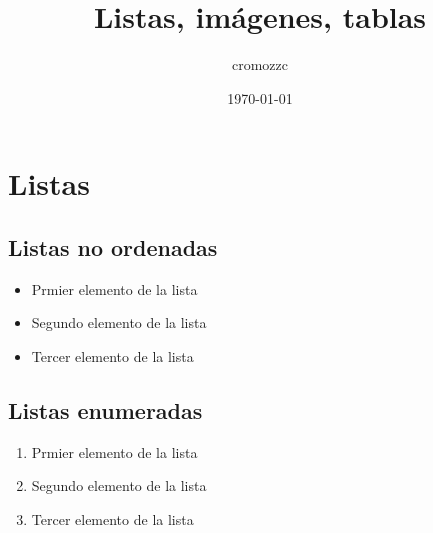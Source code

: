 \documentclass[titlepage,12pt]{article}
\title{Listas, imágenes, tablas}
\author{cromozzc}
\date{\today}
\begin{document}
\maketitle

\section{Listas}

\subsection{Listas no ordenadas}

\begin{itemize}
    \item Prmier elemento de la lista
    \item Segundo elemento de la lista
    \item Tercer elemento de la lista
\end{itemize}

\subsection{Listas enumeradas}
\begin{enumerate}
    \item Prmier elemento de la lista
    \item Segundo elemento de la lista
    \item Tercer elemento de la lista
\end{enumerate}
\end{document}
